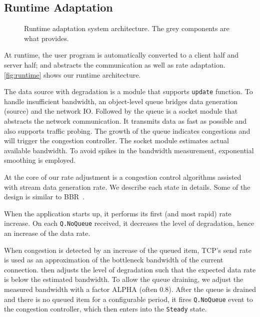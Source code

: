 \subsection{Runtime Adaptation}
\label{sec:runtime}

\begin{figure}
  \centering
  \resizebox{\columnwidth}{!}{
    
  }
  \caption{Runtime adaptation system architecture. The grey components are what
    \sysname{} provides.}
  \label{fig:runtime}
\end{figure}

At runtime, the user program is automatically converted to a client half and
server half; and \sysname{} abstracts the communication as well as rate
adaptation. \autoref{fig:runtime} shows our runtime architecture.

The data source with degradation is a module that supports \texttt{update}
function. To handle insufficient bandwidth, an object-level queue bridges data
generation (source) and the network IO. Followed by the queue is a socket module
that abstracts the network communication. It transmits data as fast as possible
and also supports traffic probing. The growth of the queue indicates congestions
and will trigger the congestion controller. The socket module estimates actual
available bandwidth. To avoid spikes in the bandwidth measurement, exponential
smoothing is employed.

At the core of our rate adjustment is a congestion control algorithms assisted
with stream data generation rate. We describe each state in details. Some of the
design is similar to BBR~\cite{cardwell2017bbr}.

 When the application starts up, it performs its first
(and most rapid) rate increase. On each \texttt{Q.NoQueue} received, it
decreases the level of degradation, hence an increase of the data rate.

 When congestion is detected by an increase of the
queued item, TCP's send rate is used as an approximation of the bottleneck
bandwidth of the current connection. \sysname{} then adjusts the level of
degradation such that the expected data rate is below the estimated
bandwidth. To allow the queue draining, we adjust the measured bandwidth with a
factor ALPHA (often 0.8). After the queue is drained and there is no queued item
for a configurable period, it fires \texttt{Q.NoQueue} event to the congestion
controller, which then enters into the \texttt{Steady} state.

